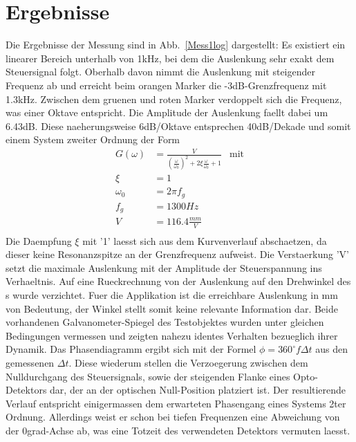 \section{Ergebnisse}
Die Ergebnisse der Messung sind in Abb.~\ref{Mess1log} dargestellt: Es existiert ein linearer Bereich unterhalb von 1kHz, bei dem die Auslenkung sehr exakt dem Steuersignal folgt. Oberhalb davon nimmt die Auslenkung mit steigender Frequenz ab und erreicht beim orangen Marker die -3dB-Grenzfrequenz mit 1.3kHz. Zwischen dem gruenen und roten Marker verdoppelt sich die Frequenz, was einer Oktave entspricht. Die Amplitude der Auslenkung faellt dabei um 6.43dB. Diese naeherungsweise 6dB/Oktave entsprechen 40dB/Dekade und somit einem System zweiter Ordnung der Form\cite{Staudecker}
	\begin{align*}
	G(\omega) & = \frac{V}{(\frac{\omega}{\omega_0} )^2 + 2 \xi \frac{\omega}{\omega_0}  +1} & \textrm{mit} \\
	\xi & = 1 \\
	\omega_0 &= 2\pi f_g \\
	f_{g}	& = 1300 Hz \\
	V &= 116.4 \frac{mm}{V} \\ %
	\end{align*}
Die Daempfung $\xi$ mit '1' laesst sich aus dem Kurvenverlauf abschaetzen, da dieser keine Resonanzspitze an der Grenzfrequenz aufweist. Die Verstaerkung 'V' setzt die maximale Auslenkung mit der Amplitude der Steuerspannung ins Verhaeltnis. Auf eine Rueckrechnung von der Auslenkung auf den Drehwinkel des \galvo s wurde verzichtet. Fuer die Applikation ist die erreichbare Auslenkung in mm von Bedeutung, der Winkel stellt somit keine relevante Information dar. Beide vorhandenen  Galvanometer-Spiegel des Testobjektes wurden unter gleichen Bedingungen vermessen und zeigten nahezu identes Verhalten bezueglich ihrer Dynamik. Das Phasendiagramm ergibt sich mit der Formel \textrm{$\phi = 360^\circ f  \Delta t$} aus den gemessenen $\Delta t$. Diese wiederum stellen die Verzoegerung zwischen dem Nulldurchgang des Steuersignals, sowie der steigenden Flanke eines Opto-Detektors dar, der an der optischen Null-Position platziert ist. Der resultierende Verlauf entspricht einigermassen dem erwarteten Phasengang eines Systems 2ter Ordnung. Allerdings weist er schon bei tiefen Frequenzen eine Abweichung von der 0grad-Achse ab, was eine Totzeit des verwendeten Detektors vermuten laesst.
